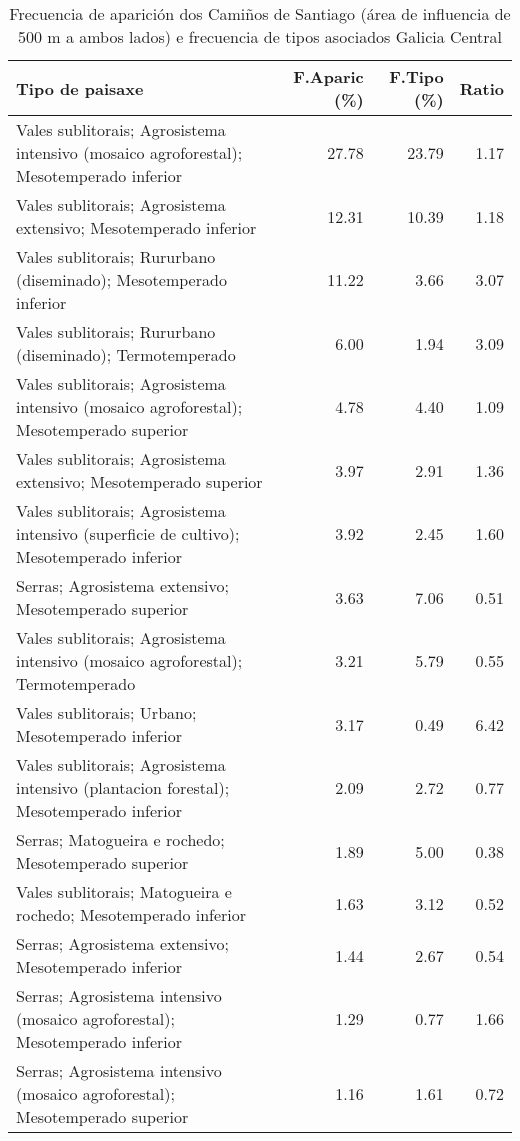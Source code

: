 \begin{table}[p]
\centering
\caption{Frecuencia de aparición dos Camiños de Santiago (área de influencia de 500 m a ambos lados) e frecuencia de tipos asociados Galicia Central} 
\label{vcamino7}
\begin{tabular}{lrrr}
  \hline
Tipo de paisaxe & F.Aparic (\%) & F.Tipo (\%) & Ratio \\ 
  \hline
Vales sublitorais; Agrosistema intensivo (mosaico agroforestal); Mesotemperado inferior & 27.78 & 23.79 & 1.17 \\ 
  Vales sublitorais; Agrosistema extensivo; Mesotemperado inferior & 12.31 & 10.39 & 1.18 \\ 
  Vales sublitorais; Rururbano (diseminado); Mesotemperado inferior & 11.22 & 3.66 & 3.07 \\ 
  Vales sublitorais; Rururbano (diseminado); Termotemperado & 6.00 & 1.94 & 3.09 \\ 
  Vales sublitorais; Agrosistema intensivo (mosaico agroforestal); Mesotemperado superior & 4.78 & 4.40 & 1.09 \\ 
  Vales sublitorais; Agrosistema extensivo; Mesotemperado superior & 3.97 & 2.91 & 1.36 \\ 
  Vales sublitorais; Agrosistema intensivo (superficie de cultivo); Mesotemperado inferior & 3.92 & 2.45 & 1.60 \\ 
  Serras; Agrosistema extensivo; Mesotemperado superior & 3.63 & 7.06 & 0.51 \\ 
  Vales sublitorais; Agrosistema intensivo (mosaico agroforestal); Termotemperado & 3.21 & 5.79 & 0.55 \\ 
  Vales sublitorais; Urbano; Mesotemperado inferior & 3.17 & 0.49 & 6.42 \\ 
  Vales sublitorais; Agrosistema intensivo (plantacion forestal); Mesotemperado inferior & 2.09 & 2.72 & 0.77 \\ 
  Serras; Matogueira e rochedo; Mesotemperado superior & 1.89 & 5.00 & 0.38 \\ 
  Vales sublitorais; Matogueira e rochedo; Mesotemperado inferior & 1.63 & 3.12 & 0.52 \\ 
  Serras; Agrosistema extensivo; Mesotemperado inferior & 1.44 & 2.67 & 0.54 \\ 
  Serras; Agrosistema intensivo (mosaico agroforestal); Mesotemperado inferior & 1.29 & 0.77 & 1.66 \\ 
  Serras; Agrosistema intensivo (mosaico agroforestal); Mesotemperado superior & 1.16 & 1.61 & 0.72 \\ 
   \hline
\end{tabular}
\end{table}
